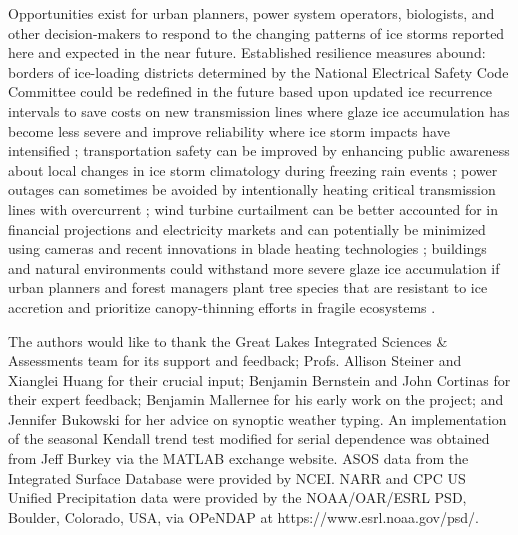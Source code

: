 \documentclass[twocol]{ametsoc}
\begin{document}
Opportunities exist for urban planners, power system operators, biologists, and other decision-makers to respond to the changing patterns of ice storms reported here and expected in the near future. Established resilience measures abound: borders of ice-loading districts determined by the National Electrical Safety Code Committee could be redefined in the future based upon updated ice recurrence intervals to save costs on new transmission lines where glaze ice accumulation has become less severe and improve reliability where ice storm impacts have intensified \citep{american2013minimum}; transportation safety can be improved by enhancing public awareness about local changes in ice storm climatology during freezing rain events \citep{call2009assessment}; power outages can sometimes be avoided by intentionally heating critical transmission lines with overcurrent \citep{bendel1981review,huneault2005combined}; wind turbine curtailment can be better accounted for in financial projections and electricity markets and can potentially be minimized using cameras and recent innovations in blade heating technologies \citep{bird2014wind}; buildings and natural environments could withstand more severe glaze ice accumulation if urban planners and forest managers plant tree species that are resistant to ice accretion and prioritize canopy-thinning efforts in fragile ecosystems \citep{hauer2006trees}.

















%

\acknowledgments

The authors would like to thank the Great Lakes Integrated Sciences \& Assessments team for its support and feedback; Profs. Allison Steiner and Xianglei Huang for their crucial input; Benjamin Bernstein and John Cortinas for their expert feedback; Benjamin Mallernee for his early work on the project; and Jennifer Bukowski for her advice on synoptic weather typing. An implementation of the seasonal Kendall trend test modified for serial dependence was obtained from Jeff Burkey via the MATLAB exchange website. ASOS data from the Integrated Surface Database were provided by NCEI. NARR and CPC US Unified Precipitation data were provided by the NOAA/OAR/ESRL PSD, Boulder, Colorado, USA, via OPeNDAP at https://www.esrl.noaa.gov/psd/.  
\end{document}
